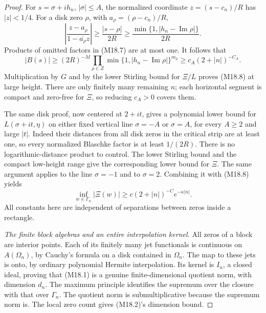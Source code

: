 \documentclass[11pt,a4paper]{article}
\begin{document}
\begin{proof}
For \(s=\sigma+i h_n\), \(|\sigma|\le A\), the normalized
coordinate \(z=(s-c_n)/R\) has \(|z|<1/4\).
For a disk zero \(\rho\), with \(a_\rho=(\rho-c_n)/R\),
\[
 \left|\frac{z-a_\rho}{1-\overline{a_\rho}z}\right|
    \ge\frac{|s-\rho|}{2R}
    \ge\frac{\min\{1,|h_n-\operatorname{Im}\rho|\}}{2R}.
\]
Products of omitted factors in (M18.7) are at most one.
It follows that
\[
 |B(s)|\ge(2R)^{-M}
   \prod_{\rho\in Z}
      \min\{1,|h_n-\operatorname{Im}\rho|\}^{m_\rho}
             \ge c_A(2+|n|)^{-C_A}.
\]
Multiplication by \(G\) and by the lower Stirling bound
for \(\Xi/L\) proves (M18.8) at large height.
There are only finitely many remaining \(n\); each
horizontal segment is compact and zero-free for \(\Xi\),
so reducing \(c_A>0\) covers them.

The same disk proof, now centered at \(2+it\), gives a
polynomial lower bound for \(L(\sigma+it,\eta)\) on either
fixed vertical line \(\sigma=-A\) or \(\sigma=A\), for
every \(A\ge2\) and large \(|t|\).  Indeed their distances
from all disk zeros in the critical strip are at least one,
so every normalized Blaschke factor is at least \(1/(2R)\).
There is no logarithmic-distance product to control.
The lower Stirling bound and the compact low-height range
give the corresponding lower bound for \(\Xi\).
The same argument applies to the line \(\sigma=-1\)
and to \(\sigma=2\).  Combining it with (M18.8) yields
\[
 \inf_{w\in\Gamma_n}|\Xi(w)|
       \ge c(2+|n|)^{-C}e^{-\kappa|n|}.                          \tag{M18.9}
\]
All constants here are independent of separations between
zeros inside a rectangle.

\emph{The finite block algebras and an entire interpolation kernel.}
All zeros of a block are interior points.  Each of its
finitely many jet functionals is continuous on
\(A(\Omega_n)\), by Cauchy's formula on a disk contained
in \(\Omega_n\).  The map to these jets is onto, by
ordinary polynomial Hermite interpolation.  Its kernel
is \(I_n\), a closed ideal, proving that (M18.1) is a
genuine finite-dimensional quotient norm, with dimension
\(d_n\).  The maximum principle identifies the supremum
over the closure with that over \(\Gamma_n\).
The quotient norm is submultiplicative because the
supremum norm is.  The local zero count gives (M18.2)'s
dimension bound.


\end{proof}
\end{document}
